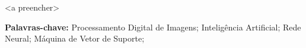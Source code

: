 \begin{resumo}

<a preencher>
 
\vspace{0.5cm}
 
 \textbf{Palavras-chave:} Processamento Digital de Imagens; Inteligência Artificial; Rede Neural; Máquina de Vetor de Suporte; 
\end{resumo}